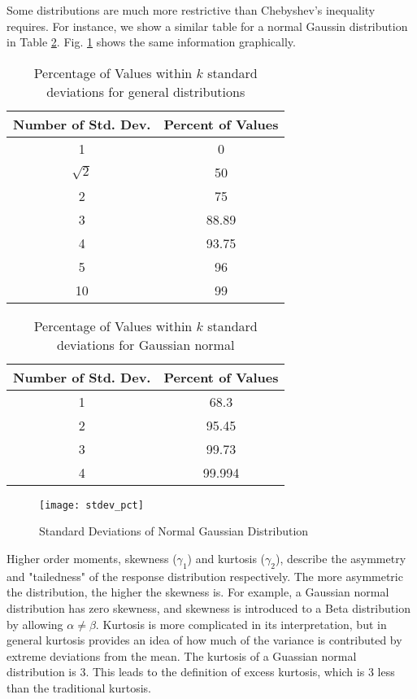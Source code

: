 Some distributions are much more restrictive than Chebyshev's inequality requires.  For instance, we 
show a similar table for a normal Gaussin distribution in Table \ref{tab:norm stdev}.  Fig. \ref{fig:stdev pct}
shows the same information graphically.
\begin{table}[htb]
  \centering
  \begin{tabular}{c c}
  Number of Std. Dev. & Percent of Values \\ \hline
  1 & 0 \\
  $\sqrt{2}$ & 50 \\
  2 & 75 \\
  3 & 88.89 \\
  4 & 93.75 \\
  5 & 96 \\
  10 & 99
  \end{tabular}
  \caption{Percentage of Values within $k$ standard deviations for general distributions}
  \label{tab:cheby stdev}
\end{table}
\begin{table}[htb]
  \centering
  \begin{tabular}{c c}
  Number of Std. Dev. & Percent of Values \\ \hline
  1 & 68.3 \\
  2 & 95.45 \\
  3 & 99.73 \\
  4 & 99.994 \\
  \end{tabular}
  \caption{Percentage of Values within $k$ standard deviations for Gaussian normal}
  \label{tab:norm stdev}
\end{table}
\begin{figure}[H]
  \centering
  \texttt{[image: stdev\_pct]}
  \caption{Standard Deviations of Normal Gaussian Distribution}
  \label{fig:stdev pct}
\end{figure}
Higher order moments, skewness ($\gamma_1$) and kurtosis ($\gamma_2$), describe the asymmetry and "tailedness"
of the response distribution respectively.  The more asymmetric the distribution, the
higher the skewness is.  For example, a Gaussian normal distribution has zero skewness,
and skewness is introduced to a Beta distribution by allowing $\alpha\neq\beta$.
Kurtosis is more complicated in its interpretation, but in general kurtosis provides an idea
of how much of the variance is contributed by extreme deviations from the mean.  The kurtosis
of a Guassian normal distribution is 3.  This leads to the definition of excess kurtosis,
which is 3 less than the traditional kurtosis.  

